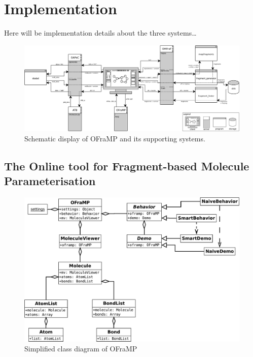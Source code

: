 \chapter{Implementation}

Here will be implementation details about the three systems\ldots

\nlipsum


\begin{figure}
\begin{center}
\includegraphics[width=\textwidth]{img/network_diagram.pdf}
\vspace{1em}
\caption{Schematic display of OFraMP and its supporting systems.}
\end{center}
\end{figure}


\section[OFraMP]{The Online tool for Fragment-based Molecule Parameterisation}
\nlipsum

\begin{figure}[h!]
\begin{center}
\includegraphics[width=\textwidth]{img/oframp_class.pdf}
\caption{Simplified class diagram of OFraMP}
\end{center}
\end{figure}

